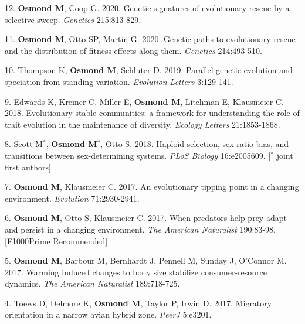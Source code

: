 \documentclass[12pt]{article}
\begin{document}
\noindent\hspace{.1cm}12. \textbf{Osmond M}, Coop G. 2020. Genetic signatures of evolutionary rescue by a selective sweep. \textit{Genetics} 215:813-829.

\noindent\hspace{.1cm}11. \textbf{Osmond M}, Otto SP, Martin G. 2020. Genetic paths to evolutionary rescue and the distribution of fitness effects along them. \textit{Genetics} 214:493-510.

\noindent\hspace{.1cm}10. Thompson K, \textbf{Osmond M}, Schluter D. 2019. Parallel genetic evolution and speciation from standing variation. \textit{Evolution Letters} 3:129-141.

\noindent\hspace{.1cm}9. Edwards K, Kremer C, Miller E, \textbf{Osmond M}, Litchman E, Klausmeier C. 2018. Evolutionary stable communities: a framework for understanding the role of trait evolution in the maintenance of diversity. \textit{Ecology Letters} 21:1853-1868.

\noindent\hspace{.1cm}8. Scott M$^*$, \textbf{Osmond M}$^*$, Otto S. 2018. Haploid selection, sex ratio bias, and transitions between sex-determining systems. \textit{PLoS Biology} 16:e2005609. [$^*$ joint first authors]

\noindent\hspace{.1cm}7. \textbf{Osmond M}, Klausmeier C. 2017. An evolutionary tipping point in a changing environment. \textit{Evolution} 71:2930-2941.

\noindent\hspace{.1cm}6. \textbf{Osmond M}, Otto S, Klausmeier C. 2017. When predators help prey adapt and persist in a changing environment. \textit{The American Naturalist} 190:83-98. [F1000Prime Recommended]

\noindent\hspace{.1cm}5. \textbf{Osmond M}, Barbour M, Bernhardt J, Pennell M, Sunday J, O'Connor M. 2017. Warming induced changes to body size stabilize consumer-resource dynamics. \textit{The American Naturalist} 189:718-725.

\noindent\hspace{.1cm}4. Toews D, Delmore K, \textbf{Osmond M}, Taylor P, Irwin D. 2017. Migratory orientation in a narrow avian hybrid zone. \textit{PeerJ} 5:e3201.
\end{document}
